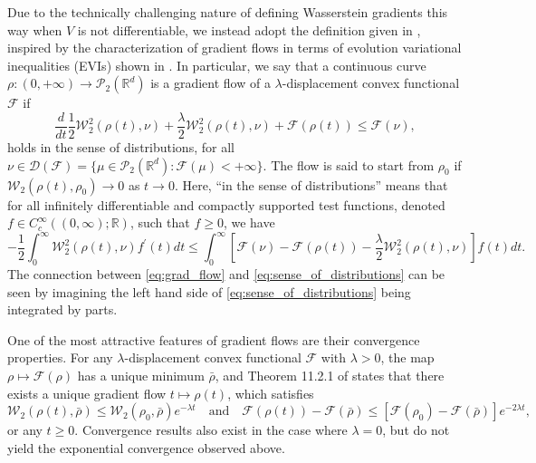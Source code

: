 \documentclass[final,12pt]{colt2018}
\newcommand{\was}{\mathcal{W}}
\begin{document}
Due to the technically challenging nature of defining Wasserstein gradients this way when $V$ is not differentiable, we instead adopt the definition given in \citet{ambrosio2009existence}, inspired by the characterization of gradient flows in terms of evolution variational inequalities (EVIs) shown in \citet[][Theorem 11.1.4]{ambrosio2005}. In particular, we say that a continuous curve $\rho : (0,+\infty) \to \mathcal{P}_2(\mathbb{R}^d)$ is a gradient flow of a $\lambda$-displacement convex functional $\mathcal{F}$ if
\begin{equation}\label{eq:grad_flow}
\frac{d}{dt} \frac{1}{2} \was_2^2(\rho(t),\nu) + \frac{\lambda}{2}\was_2^2(\rho(t),\nu) + \mathcal{F}(\rho(t)) \leq \mathcal{F}(\nu),
\end{equation}
holds in the sense of distributions, for all $\nu\in \mathcal{D}(\mathcal{F}) = \{\mu \in \mathcal{P}_2(\mathbb{R}^d) : \mathcal{F}(\mu) < +\infty\}$. The flow is said to start from $\rho_0$ if $\was_2(\rho(t),\rho_0) \to 0$ as $t \to 0$. Here, ``in the sense of distributions'' means that for all infinitely differentiable and compactly supported test functions, denoted $f \in C_c^\infty((0,\infty); \mathbb{R})$, such that $f\geq 0$, we have
\begin{equation} \label{eq:sense_of_distributions}
-\frac{1}{2}\int_0^\infty\was_2^2(\rho(t),\nu)f^\prime(t) dt \leq \int_0^\infty \left[\mathcal{F}(\nu)- \mathcal{F}(\rho(t)) - \frac{\lambda}{2}\was_2^2(\rho(t),\nu) \right]f(t) dt.
\end{equation}
The connection between \eqref{eq:grad_flow} and \eqref{eq:sense_of_distributions} can be seen by imagining the left hand side of \eqref{eq:sense_of_distributions} being integrated by parts. 

One of the most attractive features of gradient flows are their convergence properties. For any $\lambda$-displacement convex functional $\mathcal{F}$ with $\lambda>0$, the map $\rho \mapsto \mathcal{F}(\rho)$ has a unique minimum $\bar{\rho}$, and Theorem 11.2.1 of \citet{ambrosio2005} states that there exists a unique gradient flow $t\mapsto \rho(t)$, which satisfies
\begin{equation}\label{eq:contraction_F}
\was_2(\rho(t),\bar{\rho}) \leq \was_2(\rho_0,\bar{\rho})e^{-\lambda t} \quad \text{and}\quad \mathcal{F}(\rho(t)) - \mathcal{F}(\bar{\rho})  \leq \left[\mathcal{F}(\rho_0) - \mathcal{F}(\bar{\rho})\right]e^{-2\lambda t},
\end{equation}
or any $t\geq 0$. Convergence results also exist in the case where $\lambda = 0$, but do not yield the exponential convergence observed above. 
\end{document}
